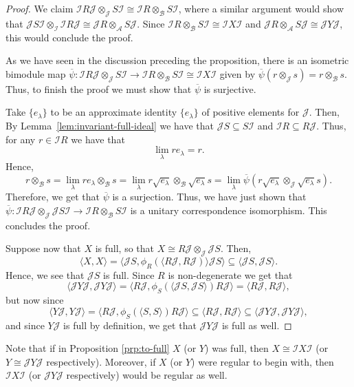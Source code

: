 \documentclass[11pt, letterpaper,final]{amsart}
\newcommand{\A}{{\mathcal{A}}}
\newcommand{\B}{{\mathcal{B}}}
\newcommand{\I}{{\mathcal{I}}}
\newcommand{\J}{{\mathcal{J}}}
\theoremstyle{definition}
\begin{document}
\begin{proof}
We claim $\I R \J \otimes_{\J} S \I \cong \I R \otimes_{\B} S \I$, where a similar argument would show that $\J S \I \otimes_{\I} \I R \J \cong \J R \otimes_{\A} S \J$. Since $\I R \otimes_{\B} S \I \cong \I X \I$ and $ \J R \otimes_{\A} S \J \cong \J Y \J$, this would conclude the proof.

As we have seen in the discussion preceding the proposition, there is an isometric bimodule map $\overline{\psi} : \I R \J \otimes_{\J} S \I \rightarrow \I R \otimes_{\B} S \I \cong \I X \I$ given by $\overline{\psi}(r\otimes_{\J} s) = r\otimes_{\B} s$. Thus, to finish the proof we must show that $\overline{\psi}$ is surjective.

Take $\{ e_\lambda \}$ to be an approximate identity $\{e_\lambda\}$ of positive elements for $\J$. Then, By Lemma~\ref{lem:invariant-full-ideal} we have that $\J S \subseteq S \I$ and $\I R \subseteq R \J$. Thus, for any $r\in \I R$ we have that
$$
\lim_{\lambda} r e_{\lambda} = r.
$$
Hence,
$$
r\otimes_{\B} s = \lim_{\lambda} r e_{\lambda} \otimes_{\B} s = \lim_{\lambda} r \sqrt{e_{\lambda}} \otimes_{\B} \sqrt{e_{\lambda}}s = \lim_{\lambda} \overline{\psi} (r \sqrt{e_{\lambda}} \otimes_{\J} \sqrt{e_{\lambda}}s).
$$
Therefore, we get that $\overline{\psi}$ is a surjection. Thus, we have just shown that $\overline{\psi} \colon \I R \J \otimes_{\J} \J S \I \to \I R \otimes_{\B} S \I$ is a unitary correspondence isomorphism. This concludes the proof.

Suppose now that $X$ is full, so that $X \cong R\mathcal{J} \otimes_{\mathcal{J}} \mathcal{J}S$. Then,
$$
\langle X, X \rangle = \langle \mathcal{J} S, \phi_R(\langle R \mathcal{J}, R \mathcal{J}) \rangle \mathcal{J} S \rangle \subseteq \langle \mathcal{J} S, \mathcal{J} S \rangle.
$$
Hence, we see that $\J S$ is full. Since $R$ is non-degenerate we get that
$$
\langle \J Y \J, \J Y \J \rangle = \langle R \J, \phi_S(\langle \J S, \J S\rangle) R \J \rangle = \langle R \J, R \J \rangle,
$$
but now since
$$
 \langle Y \J, Y \J \rangle = \langle R \J, \phi_S(\langle S, S \rangle) R \J \rangle \subseteq \langle R \J, R \J \rangle \subseteq \langle \J Y \J, \J Y \J \rangle,
$$
and since $Y \J$ is full by definition, we get that $\J Y \J$ is full as well.
\end{proof}

Note that if in Proposition \ref{prp:to-full} $X$ (or $Y$) was full, then $X\cong \I X \I$ (or $Y \cong \J Y \J$ respectively). Moreover, if $X$ (or $Y$) were regular to begin with, then $\I X\I$ (or $\J Y \J$ respectively) would be regular as well.
\end{document}
